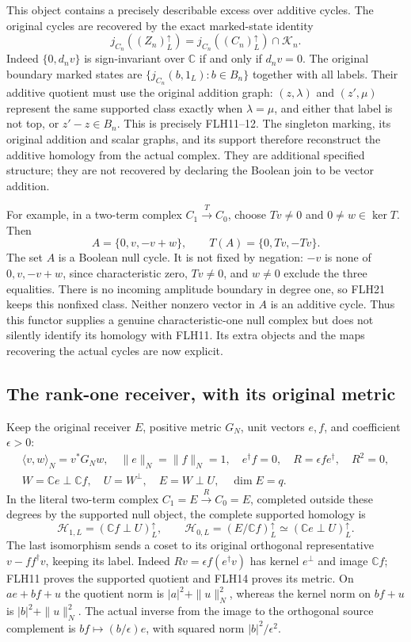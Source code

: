 This object contains a precisely describable excess over
additive cycles. The original cycles are recovered by the
exact marked-state identity
\[
j_{C_n}((Z_n)_L^\uparrow)
 =j_{C_n}((C_n)_L^\uparrow)\cap\mathcal K_n.
\tag{FLH23}
\]
Indeed \(\{0,d_nv\}\) is sign-invariant over \(\mathbb C\)
if and only if \(d_nv=0\). The original boundary marked states
are \(\{j_{C_n}(b,1_L):b\in B_n\}\) together with all labels.
Their additive quotient must use the original addition graph:
\((z,\lambda)\) and \((z',\mu)\) represent the same supported
class exactly when \(\lambda=\mu\), and either that label is
not top, or \(z'-z\in B_n\). This is precisely FLH11--12.
The singleton marking, its original addition and scalar
graphs, and its support therefore reconstruct the additive
homology from the actual complex. They are additional
specified structure; they are not recovered by declaring
the Boolean join to be vector addition.

For example, in a two-term complex \(C_1\xrightarrow{T}C_0\),
choose \(Tv\ne0\) and \(0\ne w\in\ker T\). Then
\[
A=\{0,v,-v+w\},\qquad T(A)=\{0,Tv,-Tv\}.
\tag{FLH24}
\]
The set \(A\) is a Boolean null cycle. It is not fixed by
negation: \(-v\) is none of \(0,v,-v+w\), since characteristic
zero, \(Tv\ne0\), and \(w\ne0\) exclude the three equalities.
There is no incoming amplitude boundary in degree one, so
FLH21 keeps this nonfixed class. Neither nonzero vector in
\(A\) is an additive cycle. Thus this functor supplies a
genuine characteristic-one null complex but does not silently
identify its homology with FLH11. Its extra objects and the
maps recovering the actual cycles are now explicit.

\subsection{The rank-one receiver, with its original metric}

Keep the original receiver \(E\), positive metric \(G_N\),
unit vectors \(e,f\), and coefficient \(\epsilon>0\):
\[
\begin{gathered}
\langle v,w\rangle_N=v^*G_Nw,\quad
\|e\|_N=\|f\|_N=1,\quad e^\dagger f=0,\quad
R=\epsilon f e^\dagger,\quad R^2=0,\\
W=\mathbb Ce\mathbin\perp\mathbb Cf,\quad
U=W^\perp,\quad E=W\mathbin\perp U,\quad \dim E=q .
\end{gathered}\tag{FLH25}
\]
In the literal two-term complex \(C_1=E\xrightarrow{R}C_0=E\),
completed outside these degrees by the supported null object,
the complete supported homology is
\[
\mathcal H_{1,L}=(\mathbb Cf\mathbin\perp U)_L^\uparrow,\qquad
\mathcal H_{0,L}=(E/\mathbb Cf)_L^\uparrow
 \simeq(\mathbb Ce\mathbin\perp U)_L^\uparrow .
\tag{FLH26}
\]
The last isomorphism sends a coset to its original orthogonal
representative \(v-ff^\dagger v\), keeping its label.
Indeed \(Rv=\epsilon f(e^\dagger v)\) has kernel \(e^\perp\)
and image \(\mathbb Cf\); FLH11 proves the supported quotient
and FLH14 proves its metric. On \(a e+b f+u\) the quotient
norm is \(|a|^2+\|u\|_N^2\), whereas the kernel norm on
\(bf+u\) is \(|b|^2+\|u\|_N^2\).
The actual inverse from the image to the orthogonal source
complement is \(bf\mapsto (b/\epsilon)e\), with squared norm
\(|b|^2/\epsilon^2\).

